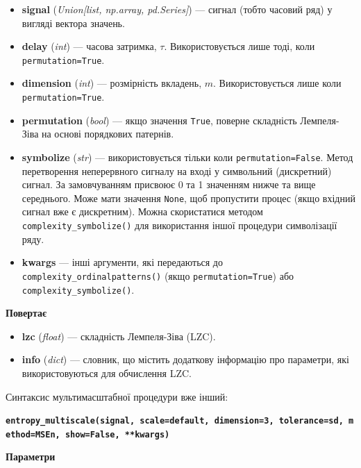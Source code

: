 \documentclass[
  letterpaper,
]{report}
\providecommand{\tightlist}{%
  \setlength{\itemsep}{0pt}\setlength{\parskip}{0pt}}\usepackage{longtable,booktabs,array}
\begin{document}
\begin{itemize}
\tightlist
\item
  \textbf{signal} (\emph{Union{[}list, np.array, pd.Series{]}}) ---
  сигнал (тобто часовий ряд) у вигляді вектора значень.
\item
  \textbf{delay} (\emph{int}) --- часова затримка, \(\tau\).
  Використовується лише тоді, коли \texttt{permutation=True}.
\item
  \textbf{dimension} (\emph{int}) --- розмірність вкладень, \(m\).
  Використовується лише коли \texttt{permutation=True}.
\item
  \textbf{permutation} (\emph{bool}) --- якщо значення \texttt{True},
  поверне складність Лемпеля-Зіва на основі порядкових патернів.
\item
  \textbf{symbolize} (\emph{str}) --- використовується тільки коли
  \texttt{permutation=False}. Метод перетворення неперервного сигналу на
  вході у символьний (дискретний) сигнал. За замовчуванням присвоює 0 та
  1 значенням нижче та вище середнього. Може мати значення
  \texttt{None}, щоб пропустити процес (якщо вхідний сигнал вже є
  дискретним). Можна скористатися методом
  \texttt{complexity\_symbolize()} для використання іншої процедури
  символізації ряду.
\item
  \textbf{kwargs} --- інші аргументи, які передаються до
  \texttt{complexity\_ordinalpatterns()} (якщо
  \texttt{permutation=True}) або \texttt{complexity\_symbolize()}.
\end{itemize}

\textbf{Повертає}

\begin{itemize}
\tightlist
\item
  \textbf{lzc} (\emph{float}) --- складність Лемпеля-Зіва (LZC).
\item
  \textbf{info} (\emph{dict}) --- словник, що містить додаткову
  інформацію про параметри, які використовуються для обчислення LZC.
\end{itemize}

Синтаксис мультимасштабної процедури вже інший:

\textbf{\texttt{entropy\_multiscale(signal,\ scale=\textquotesingle{}default\textquotesingle{},\ dimension=3,\ tolerance=\textquotesingle{}sd\textquotesingle{},\ method=\textquotesingle{}MSEn\textquotesingle{},\ show=False,\ **kwargs)}}

\textbf{Параметри}
\end{document}
